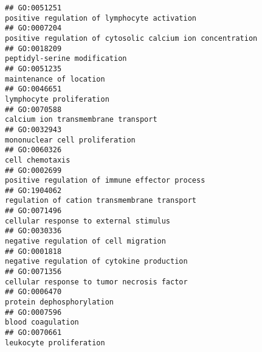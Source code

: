 \documentclass[
]{article}
\begin{document}
\begin{verbatim}
## GO:0051251                                                                                                     positive regulation of lymphocyte activation
## GO:0007204                                                                                       positive regulation of cytosolic calcium ion concentration
## GO:0018209                                                                                                                     peptidyl-serine modification
## GO:0051235                                                                                                                          maintenance of location
## GO:0046651                                                                                                                         lymphocyte proliferation
## GO:0070588                                                                                                              calcium ion transmembrane transport
## GO:0032943                                                                                                                   mononuclear cell proliferation
## GO:0060326                                                                                                                                  cell chemotaxis
## GO:0002699                                                                                                   positive regulation of immune effector process
## GO:1904062                                                                                                     regulation of cation transmembrane transport
## GO:0071496                                                                                                           cellular response to external stimulus
## GO:0030336                                                                                                            negative regulation of cell migration
## GO:0001818                                                                                                       negative regulation of cytokine production
## GO:0071356                                                                                                       cellular response to tumor necrosis factor
## GO:0006470                                                                                                                        protein dephosphorylation
## GO:0007596                                                                                                                                blood coagulation
## GO:0070661                                                                                                                          leukocyte proliferation

\end{verbatim}
\end{document}
